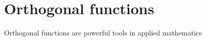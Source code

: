 \chapter{Orthogonal functions}

Orthogonal functions are powerful tools in applied mathematics




\endinput  %